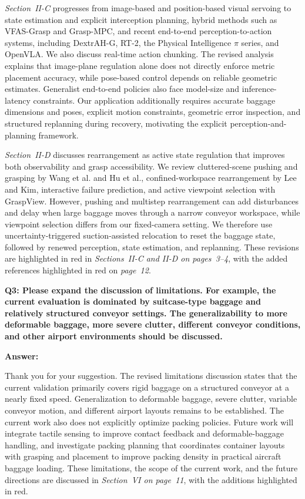 \documentclass[journal,10pt]{IEEEtran}
\newcommand{\question}[2]{%
  \par\smallskip\noindent
  {\color{responseblue}\bfseries\clubpenalty=10000\widowpenalty=10000 Q#1: #2\par}%
  \par\nobreak\noindent
}
\newcommand{\answer}{%
  \par\smallskip\noindent
  \textbf{Answer: }\ignorespaces
}
\begin{document}
\textit{Section~II-C} progresses from image-based and position-based visual servoing to state estimation and explicit interception planning, hybrid methods such as VFAS-Grasp and Grasp-MPC, and recent end-to-end perception-to-action systems, including DextrAH-G, RT-2, the Physical Intelligence $\pi$ series, and OpenVLA. We also discuss real-time action chunking. The revised analysis explains that image-plane regulation alone does not directly enforce metric placement accuracy, while pose-based control depends on reliable geometric estimates. Generalist end-to-end policies also face model-size and inference-latency constraints. Our application additionally requires accurate baggage dimensions and poses, explicit motion constraints, geometric error inspection, and structured replanning during recovery, motivating the explicit perception-and-planning framework.

\textit{Section~II-D} discusses rearrangement as active state regulation that improves both observability and grasp accessibility. We review cluttered-scene pushing and grasping by Wang et al. and Hu et al., confined-workspace rearrangement by Lee and Kim, interactive failure prediction, and active viewpoint selection with GraspView. However, pushing and multistep rearrangement can add disturbances and delay when large baggage moves through a narrow conveyor workspace, while viewpoint selection differs from our fixed-camera setting. We therefore use uncertainty-triggered suction-assisted relocation to reset the baggage state, followed by renewed perception, state estimation, and replanning. These revisions are highlighted in red in \textit{Sections~II-C and II-D on pages~3--4}, with the added references highlighted in red on \textit{page~12}.

\question{3}{Please expand the discussion of limitations. For example, the current evaluation is dominated by suitcase-type baggage and relatively structured conveyor settings. The generalizability to more deformable baggage, more severe clutter, different conveyor conditions, and other airport environments should be discussed.}

\answer
Thank you for your suggestion. The revised limitations discussion states that the current validation primarily covers rigid baggage on a structured conveyor at a nearly fixed speed. Generalization to deformable baggage, severe clutter, variable conveyor motion, and different airport layouts remains to be established. The current work also does not explicitly optimize packing policies. Future work will integrate tactile sensing to improve contact feedback and deformable-baggage handling, and investigate packing planning that coordinates container layouts with grasping and placement to improve packing density in practical aircraft baggage loading. These limitations, the scope of the current work, and the future directions are discussed in \textit{Section~VI on page~11}, with the additions highlighted in red.
\end{document}
